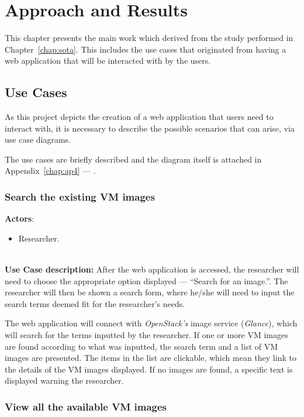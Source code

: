 \chapter{Approach and Results}\label{chap:chap4}


This chapter presents the main work which derived from the study performed in Chapter~\ref{chap:sota}. This includes the use cases that originated from having a web application that will be interacted with by the users. 

\section{Use Cases}\label{sec:use-cases}

As this project depicts the creation of a web application that users need to interact with, it is necessary to describe the possible scenarios that can arise, via use case diagrams.

The use cases are briefly described and the diagram itself is attached in Appendix~\ref{chap:ap4} --- .

\subsection{Search the existing VM images}\label{subsec:uc1}

\textbf{Actors}:

\begin{itemize}
\item Researcher.
\end{itemize}\ \\
\textbf{Use Case description:} After the web application is accessed, the researcher will need to choose the appropriate option displayed --- ``Search for an image.''. The researcher will then be shown a search form, where he/she will need to input the search terms deemed fit for the researcher's needs.

The web application will connect with \textit{OpenStack's} image service (\textit{Glance}), which will search for the terms inputted by the researcher.
If one or more VM images are found according to what was inputted, the search term and a list of VM images are presented. The items in the list are clickable, which mean they link to the details of the VM images displayed.
If no images are found, a specific text is displayed warning the researcher.


\subsection{View all the available VM images}\label{subsec:uc2}

